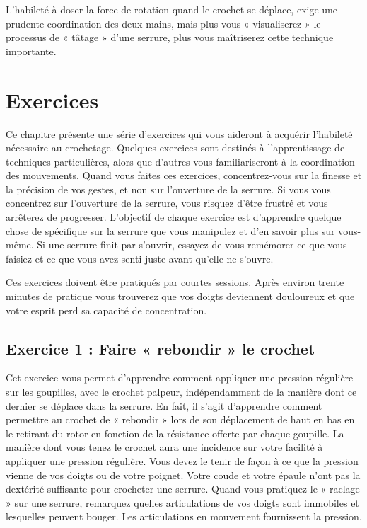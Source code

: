 \documentclass[a4paper,french,11pt,twoside]{report}
\begin{document}
L'habileté à doser la force de rotation quand le crochet se déplace, exige une prudente coordination des deux mains, mais plus vous « visualiserez » le processus de « tâtage » d'une serrure, plus vous maîtriserez cette technique importante.


\chapter{\label{chap:exercices}Exercices}
Ce chapitre présente une série d'exercices qui vous aideront à acquérir l'habileté nécessaire au crochetage. Quelques exercices sont destinés à l'apprentissage de techniques particulières, alors que d'autres vous familiariseront à la coordination des mouvements. Quand vous faites ces exercices, concentrez-vous sur la finesse et la précision de vos gestes, et non sur l'ouverture de la serrure. Si vous vous concentrez sur l'ouverture de la serrure, vous risquez d'être frustré et vous arrêterez de progresser. L'objectif de chaque exercice est d'apprendre quelque chose de spécifique sur la serrure que vous manipulez et d'en savoir plus sur vous-même. Si une serrure finit par s'ouvrir, essayez de vous remémorer ce que vous faisiez et ce que vous avez senti juste avant qu'elle ne s'ouvre.

Ces exercices doivent être pratiqués par courtes sessions. Après environ trente minutes de pratique vous trouverez que vos doigts deviennent douloureux et que votre esprit perd sa capacité de concentration.

\section{Exercice 1 : Faire « rebondir » le crochet}

Cet exercice vous permet d'apprendre comment appliquer une pression régulière sur les goupilles, avec le crochet palpeur, indépendamment de la manière dont ce dernier se déplace dans la serrure. En fait, il s'agit d'apprendre comment permettre au crochet de « rebondir » lors de son déplacement de haut en bas en le retirant du rotor en fonction de la résistance offerte par chaque goupille. La manière dont vous tenez le crochet aura une incidence sur votre facilité à appliquer une pression régulière. Vous devez le tenir de façon à ce que la pression vienne de vos doigts ou de votre poignet. Votre coude et votre épaule n'ont pas la dextérité suffisante pour crocheter une serrure. Quand vous pratiquez le « raclage » sur une serrure, remarquez quelles articulations de vos doigts sont immobiles et lesquelles peuvent bouger. Les articulations en mouvement fournissent la pression.
\end{document}
